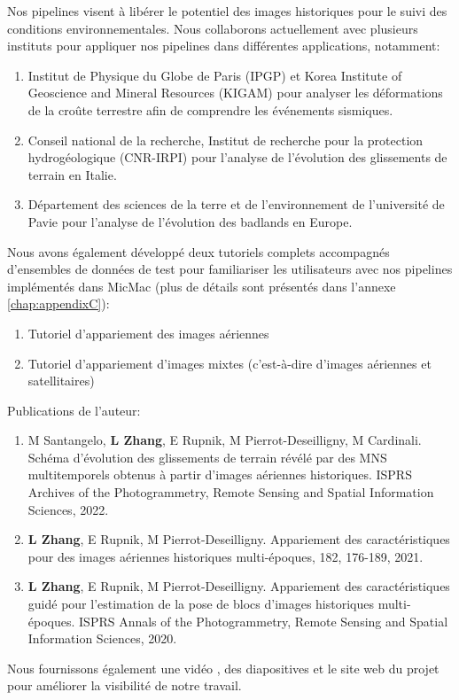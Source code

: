 \par
Nos pipelines visent à libérer le potentiel des images historiques pour le suivi des conditions environnementales. 
Nous collaborons actuellement avec plusieurs instituts pour appliquer nos pipelines dans différentes applications, notamment:\\
\begin{enumerate}
	\item Institut de Physique du Globe de Paris (IPGP) et Korea Institute of Geoscience and Mineral Resources (KIGAM) pour analyser les déformations de la croûte terrestre afin de comprendre les événements sismiques.
	\item Conseil national de la recherche, Institut de recherche pour la protection hydrogéologique (CNR-IRPI) pour l'analyse de l'évolution des glissements de terrain en Italie.
	\item Département des sciences de la terre et de l'environnement de l'université de Pavie pour l'analyse de l'évolution des badlands en Europe.
\end{enumerate}
\par
Nous avons également développé deux tutoriels complets accompagnés d'ensembles de données de test pour familiariser les utilisateurs avec nos pipelines implémentés dans MicMac\cite{HistoPcode} (plus de détails sont présentés dans l'annexe \ref{chap:appendixC}):\\
\begin{enumerate}
	\item Tutoriel d'appariement des images aériennes \cite{tuto-aerial} 
	\item Tutoriel d'appariement d'images mixtes (c'est-à-dire d'images aériennes et satellitaires) \cite{tuto-mixed} 
\end{enumerate}
\par
Publications de l'auteur:\\
\begin{enumerate}
	\item M Santangelo, \textbf{L Zhang}, E Rupnik, M Pierrot-Deseilligny, M Cardinali. Schéma d'évolution des glissements de terrain révélé par des MNS multitemporels obtenus à partir d'images aériennes historiques. ISPRS Archives of the Photogrammetry, Remote Sensing and Spatial Information Sciences, 2022.
	\item \textbf{L Zhang}, E Rupnik, M Pierrot-Deseilligny. Appariement des caractéristiques pour des images aériennes historiques multi-époques, 182, 176-189, 2021.
	\item \textbf{L Zhang}, E Rupnik, M Pierrot-Deseilligny. Appariement des caractéristiques guidé pour l'estimation de la pose de blocs d'images historiques multi-époques. ISPRS Annals of the Photogrammetry, Remote Sensing and Spatial Information Sciences, 2020.
\end{enumerate}
Nous fournissons également une vidéo \cite{HistoPVideo}, des diapositives \cite{HistoPSlides} et le site web du projet \cite{HistoPProj} pour améliorer la visibilité de notre travail.\\

